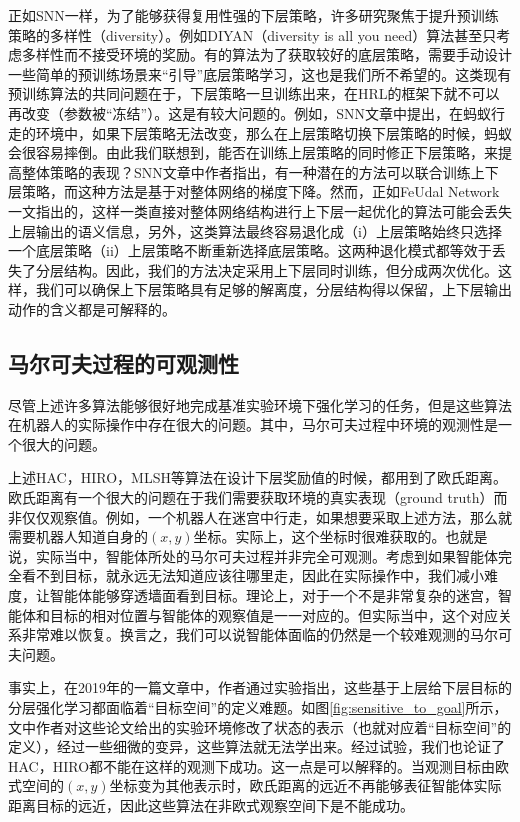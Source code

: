 正如SNN一样，为了能够获得复用性强的下层策略，许多研究聚焦于提升预训练策略的多样性（diversity）\cite{DIYAN}\cite{Learning_and_Transfer_of_Modulated_Locomotor_Controllers}。例如DIYAN（diversity is all you need）算法甚至只考虑多样性而不接受环境的奖励。有的算法\cite{Learning_and_Transfer_of_Modulated_Locomotor_Controllers}为了获取较好的底层策略，需要手动设计一些简单的预训练场景来``引导''底层策略学习，这也是我们所不希望的。这类现有预训练算法的共同问题在于，下层策略一旦训练出来，在HRL的框架下就不可以再改变（参数被``冻结''）。这是有较大问题的。例如，SNN文章中提出，在蚂蚁行走的环境中，如果下层策略无法改变，那么在上层策略切换下层策略的时候，蚂蚁会很容易摔倒。由此我们联想到，能否在训练上层策略的同时修正下层策略，来提高整体策略的表现？SNN文章中作者指出，有一种潜在的方法可以联合训练上下层策略，而这种方法是基于对整体网络的梯度下降\cite{categorical_gradient}。然而，正如FeUdal Network\cite{feudal}一文指出的，这样一类直接对整体网络结构进行上下层一起优化的算法可能会丢失上层输出的语义信息，另外，这类算法最终容易退化成（i）上层策略始终只选择一个底层策略（ii）上层策略不断重新选择底层策略。这两种退化模式都等效于丢失了分层结构。因此，我们的方法决定采用上下层同时训练，但分成两次优化。这样，我们可以确保上下层策略具有足够的解离度，分层结构得以保留，上下层输出动作的含义都是可解释的。

\subsection{马尔可夫过程的可观测性}
尽管上述许多算法能够很好地完成基准实验环境下强化学习的任务，但是这些算法在机器人的实际操作中存在很大的问题。其中，马尔可夫过程中环境的观测性是一个很大的问题。

上述HAC\cite{HAC}，HIRO\cite{HIRO}，MLSH\cite{MLSH}等算法在设计下层奖励值的时候，都用到了欧氏距离。欧氏距离有一个很大的问题在于我们需要获取环境的真实表现（ground truth）而非仅仅观察值。例如，一个机器人在迷宫中行走，如果想要采取上述方法，那么就需要机器人知道自身的$(x, y)$坐标。实际上，这个坐标时很难获取的。也就是说，实际当中，智能体所处的马尔可夫过程并非完全可观测。考虑到如果智能体完全看不到目标，就永远无法知道应该往哪里走，因此在实际操作中，我们减小难度，让智能体能够穿透墙面看到目标。理论上，对于一个不是非常复杂的迷宫，智能体和目标的相对位置与智能体的观察值是一一对应的。但实际当中，这个对应关系非常难以恢复。换言之，我们可以说智能体面临的仍然是一个较难观测的马尔可夫问题。

事实上，在2019年的一篇文章\cite{sensitive_to_goal_space}中，作者通过实验指出，这些基于上层给下层目标的分层强化学习都面临着``目标空间''的定义难题。如图\ref{fig:sensitive_to_goal}所示，文中作者对这些论文给出的实验环境修改了状态的表示（也就对应着``目标空间''的定义），经过一些细微的变异，这些算法就无法学出来。经过试验，我们也论证了HAC\cite{HAC}，HIRO\cite{HIRO}都不能在这样的观测下成功。这一点是可以解释的。当观测目标由欧式空间的$(x, y)$坐标变为其他表示时，欧氏距离的远近不再能够表征智能体实际距离目标的远近，因此这些算法在非欧式观察空间下是不能成功。

